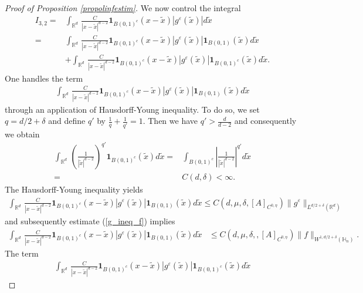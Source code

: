 \documentclass[11pt, reqno]{amsart}
\theoremstyle{definition}
\theoremstyle{remark}
\numberwithin{equation}{section}
\begin{document}
\begin{proof}[Proof of Proposition \textup{\ref{propolinfestim}}]
		
	\noindent	We now control  the integral 
		\begin{align}
			I_{3,2}=  &\int_{\mathbb{R}^d} \,  \frac{C}{|x- \tilde{x}|^{d-2}}   \mathbf{1}_{B(0,1)^c} (x- \tilde{x})|g^\varepsilon(\tilde{x}) |  d\tilde{x}\nonumber\\
			= & \int_{\mathbb{R}^d} \,  \frac{C}{|x- \tilde{x}|^{d-2}}   \mathbf{1}_{B(0,1)^c} (x- \tilde{x})|g^\varepsilon(\tilde{x})| \mathbf{1}_{B(0,1)} (\tilde{x}) d\tilde{x} \nonumber\\ &+ \int_{\mathbb{R}^d} \,  \frac{C}{|x- \tilde{x}|^{d-2}}   \mathbf{1}_{B(0,1)^c} (x- \tilde{x})|g^\varepsilon(\tilde{x}) |  \mathbf{1}_{B(0,1)^c} (\tilde{x})   d\tilde{x}.\label{I32_split}
		\end{align}
	One handles the term 
	\begin{align*}
	\int_{\mathbb{R}^d} \,  \frac{C}{|x- \tilde{x}|^{d-2}}   \mathbf{1}_{B(0,1)^c} (x- \tilde{x})|g^\varepsilon(\tilde{x})| \mathbf{1}_{B(0,1)} (\tilde{x}) d\tilde{x} 
	\end{align*}
	through an application of Hausdorff-Young inequality. 
		To do so, we set $q=d/2+\delta$ and define $q'$ by $\frac{1}{q}+\frac{1}{q'}=1$.
		Then we have $q'>\frac{d}{d-2}$ and consequently we obtain
		\begin{align*}
			\int_{\mathbb{R}^d} \,  \left( \frac{1}{|\tilde{x}|^{d-2}}  \right)^{\!\! q'}\!\!\!\mathbf{1}_{B(0,1)^c} ( \tilde{x}) d\tilde{x} = &\int_{B(0,1)^c} \left|  \frac{1}{|\tilde{x}|^{d-2}}  \right|^{q'} d\tilde{x}\\
			= \, &C(d,\delta) <\infty.
		\end{align*}
		The Hausdorff-Young inequality yields 
			\begin{align*}
		\int_{\mathbb{R}^d} \,  \frac{C}{|x- \tilde{x}|^{d-2}}   \mathbf{1}_{B(0,1)^c} (x- \tilde{x})|g^\varepsilon(\tilde{x}) | \mathbf{1}_{B(0,1)} (\tilde{x}) d\tilde{x} \leq C (d,\mu,\delta,[A]_{C^{0,\eta}} ) 	\|g^\varepsilon\|_{L^{d/2+\delta}(\mathbb{R}^d)}
		\end{align*}
		and subsequently estimate (\ref{g_ineq_f}) implies
			\begin{align}
			\int_{\mathbb{R}^d} \,  \frac{C}{|x- \tilde{x}|^{d-2}}   \mathbf{1}_{B(0,1)^c} (x- \tilde{x})|g^\varepsilon(\tilde{x}) | \mathbf{1}_{B(0,1)} (\tilde{x}) d\tilde{x} 
				&\leq  C (d, \mu, \delta, ,[A]_{C^{0,\eta}}  ) \|f\|_{W^{1,d/2+\delta}(\mathbb{H}_n)}.\label{I321}
		\end{align}
			The term 
		\begin{align*}
		\int_{\mathbb{R}^d} \,	\frac{C}{|x- \tilde{x}|^{d-2}}   \mathbf{1}_{B(0,1)^c} (x- \tilde{x})|g^\varepsilon(\tilde{x}) |  \mathbf{1}_{B(0,1)^c} (\tilde{x})  	d\tilde{x}

\end{align*}
\end{proof}
\end{document}
